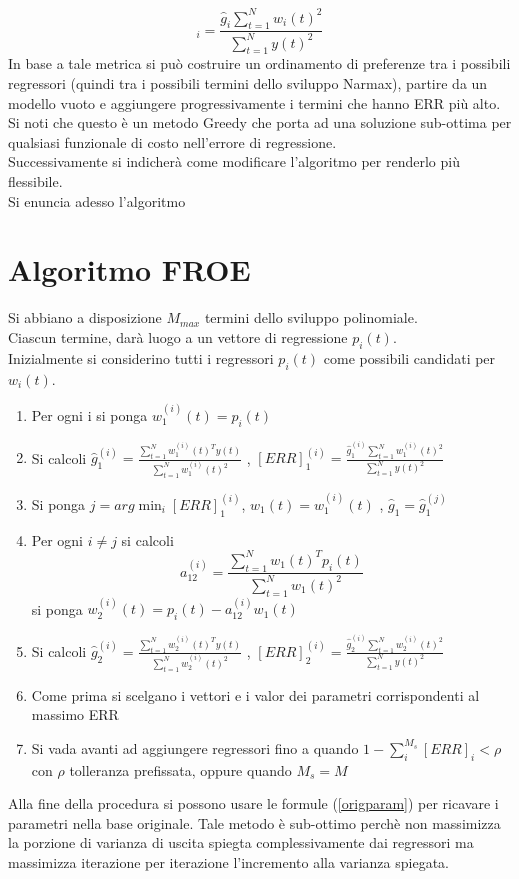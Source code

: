 \begin{equation}
[ERR]_i=\frac{\hat{g}_i\sum_{t=1}^N w_i(t)^2}{\sum_{t=1}^N y(t)^2}
\end{equation}
In base a tale metrica si può costruire un ordinamento di preferenze tra i possibili regressori (quindi tra i possibili termini dello sviluppo Narmax), partire da un modello vuoto e aggiungere progressivamente i termini che hanno ERR più alto.\\
Si noti che questo è un metodo Greedy che porta ad una soluzione sub-ottima per qualsiasi funzionale di costo nell'errore di regressione.\\
Successivamente si indicherà come modificare l'algoritmo per renderlo più flessibile.\\
Si enuncia adesso l'algoritmo
\section{Algoritmo FROE}
Si abbiano a disposizione $M_{max}$ termini dello sviluppo polinomiale.\\
Ciascun termine, darà luogo a un vettore di regressione $p_i(t)$.\\
Inizialmente si considerino tutti i regressori $p_i(t)$  come possibili candidati per $w_i(t)$.\\
\begin{enumerate}
\item Per ogni i si ponga $w_1^{(i)}(t)=p_i(t) $\\
\item Si calcoli $\hat{g}_1^{(i)}=\frac{\sum_{t=1}^N{w_1^{(i)}(t)^Ty(t)}}{\sum_{t=1}^Nw_1^{(i)}(t)^2}$ , $[ERR]_1^{(i)}=\frac{\hat{g}_1^{(i)}\sum_{t=1}^N w_1^{(i)}(t)^2}{\sum_{t=1}^N y(t)^2}$
\item Si ponga $j=arg \min_i [ERR]_1^{(i)}$, $w_1(t)=w_1^{(i)}(t) $ , $\hat{g}_1=\hat{g}_1^{(j)}$
\item Per ogni $i\neq j$ si calcoli \[a_{12}^{(i)}=\frac{\sum_{t=1}^N{w_1(t)^Tp_i(t)}}{\sum_{t=1}^Nw_1(t)^2}\]
si ponga $w_2^{(i)}(t)=p_i(t)-a_{12}^{(i)}w_1(t) $
\item Si calcoli $\hat{g}_2^{(i)}=\frac{\sum_{t=1}^N{w_2^{(i)}(t)^Ty(t)}}{\sum_{t=1}^Nw_2^{(i)}(t)^2}$ , $[ERR]_2^{(i)}=\frac{\hat{g}_2^{(i)}\sum_{t=1}^N w_2^{(i)}(t)^2}{\sum_{t=1}^N y(t)^2}$
\item Come prima si scelgano i vettori e i valor dei parametri corrispondenti al massimo ERR
\item Si vada avanti ad aggiungere regressori fino a quando $1-\sum_i^{M_s} [ERR]_i < \rho$ con $\rho$ tolleranza prefissata, oppure quando $M_s=M$
\end{enumerate}
Alla fine della procedura si possono usare le formule (\ref{origparam}) per ricavare i parametri nella base originale.
Tale metodo è sub-ottimo perchè non massimizza la porzione di varianza di uscita spiegta complessivamente dai regressori ma massimizza iterazione per iterazione l'incremento alla varianza spiegata.
